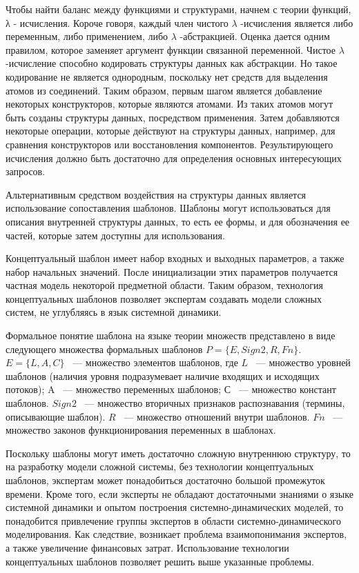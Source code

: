 Чтобы найти баланс между функциями и структурами, начнем с теории функций, λ - исчисления. Короче говоря, каждый член чистого $ \lambda $ -исчисления является либо переменным, либо применением, либо $ \lambda $ -абстракцией. Оценка дается одним правилом, которое заменяет аргумент функции связанной переменной. Чистое $ \lambda $ -исчисление способно кодировать структуры данных как абстракции. Но такое кодирование не является однородным, поскольку нет средств для выделения атомов из соединений.
Таким образом, первым шагом является добавление некоторых конструкторов, которые являются атомами. Из таких атомов могут быть созданы структуры данных, посредством применения. Затем добавляются некоторые операции, которые действуют на структуры данных, например, для сравнения конструкторов или восстановления компонентов. Результирующего исчисления должно быть достаточно для определения основных интересующих запросов. 

Альтернативным средством воздействия на структуры данных является использование сопоставления шаблонов.
Шаблоны могут использоваться для описания внутренней структуры данных, то есть ее формы, и для обозначения ее частей, которые затем доступны для использования.

Концептуальный шаблон имеет набор входных и выходных параметров, а также
набор начальных значений. После инициализации этих параметров получается частная
модель некоторой предметной области. Таким образом, технология концептуальных
шаблонов позволяет экспертам создавать модели сложных систем, не углубляясь в язык
системной динамики.

Формальное понятие шаблона на языке теории множеств представлено в виде
следующего множества формальных шаблонов $ P= \lbrace E,Sign2,R,Fn\rbrace $. $ E=\lbrace L,A,C\rbrace $
~--- множество элементов шаблонов, где $ L $ ~--- множество уровней шаблонов (наличия уровня подразумевает наличие входящих и исходящих потоков); A ~--- множество  переменных шаблонов; С ~--- множество  констант 	шаблонов. $ Sign2 $ ~--- множество 	вторичных признаков распознавания (термины, описывающие шаблон). $ R $ ~--- множество  отношений внутри шаблонов. $ Fn $ ~--- множество  законов функционирования переменных в шаблонах.

Поскольку шаблоны могут иметь достаточно сложную внутреннюю структуру,
то на разработку модели сложной системы, без технологии концептуальных шаблонов,
экспертам может понадобиться достаточно большой промежуток времени. Кроме того,
если эксперты не обладают достаточными знаниями о языке системной динамики и
опытом построения системно-динамических моделей, то понадобится привлечение
группы экспертов в области системно-динамического моделирования. Как следствие,
возникает проблема взаимопонимания экспертов, а также увеличение финансовых затрат. Использование технологии концептуальных шаблонов позволяет решить выше
указанные проблемы.\cite{henk_lambda}

